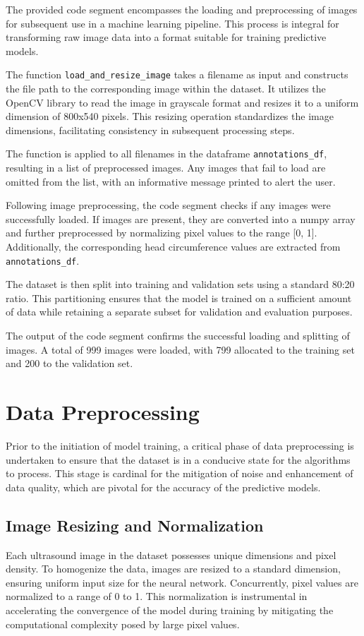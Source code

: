 \documentclass{report}
\begin{document}
The provided code segment encompasses the loading and preprocessing of images for subsequent use in a machine learning pipeline. This process is integral for transforming raw image data into a format suitable for training predictive models.

The function \texttt{load\_and\_resize\_image} takes a filename as input and constructs the file path to the corresponding image within the dataset. It utilizes the OpenCV library to read the image in grayscale format and resizes it to a uniform dimension of 800x540 pixels. This resizing operation standardizes the image dimensions, facilitating consistency in subsequent processing steps.

The function is applied to all filenames in the dataframe \texttt{annotations\_df}, resulting in a list of preprocessed images. Any images that fail to load are omitted from the list, with an informative message printed to alert the user.

Following image preprocessing, the code segment checks if any images were successfully loaded. If images are present, they are converted into a numpy array and further preprocessed by normalizing pixel values to the range [0, 1]. Additionally, the corresponding head circumference values are extracted from \texttt{annotations\_df}.

The dataset is then split into training and validation sets using a standard 80:20 ratio. This partitioning ensures that the model is trained on a sufficient amount of data while retaining a separate subset for validation and evaluation purposes.

The output of the code segment confirms the successful loading and splitting of images. A total of 999 images were loaded, with 799 allocated to the training set and 200 to the validation set.

\section{Data Preprocessing}

Prior to the initiation of model training, a critical phase of data preprocessing is undertaken to ensure that the dataset is in a conducive state for the algorithms to process. This stage is cardinal for the mitigation of noise and enhancement of data quality, which are pivotal for the accuracy of the predictive models.

\subsection{Image Resizing and Normalization}
Each ultrasound image in the dataset possesses unique dimensions and pixel density. To homogenize the data, images are resized to a standard dimension, ensuring uniform input size for the neural network. Concurrently, pixel values are normalized to a range of 0 to 1. This normalization is instrumental in accelerating the convergence of the model during training by mitigating the computational complexity posed by large pixel values.
\end{document}
